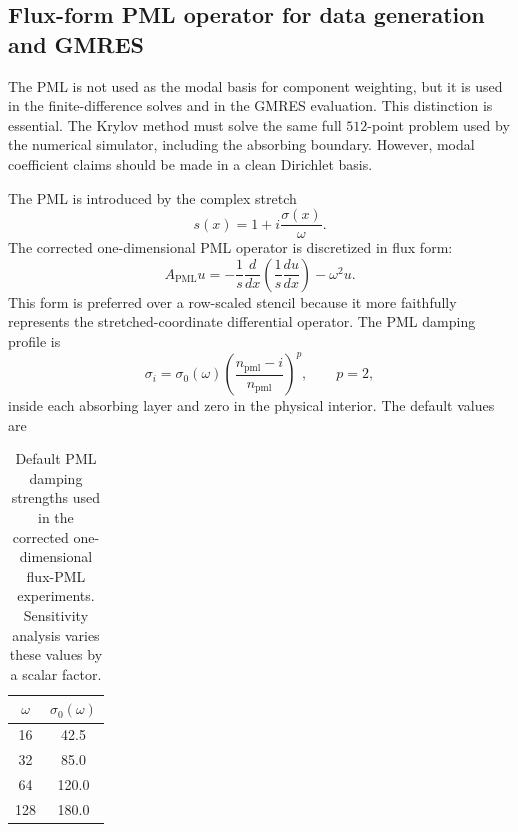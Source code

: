 \subsection{Flux-form PML operator for data generation and GMRES}
\label{subsec:methodology_1d_flux_pml}

The PML is not used as the modal basis for component weighting, but it is used
in the finite-difference solves and in the GMRES evaluation. This distinction
is essential. The Krylov method must solve the same full $512$-point problem
used by the numerical simulator, including the absorbing boundary. However,
modal coefficient claims should be made in a clean Dirichlet basis.

The PML is introduced by the complex stretch
\begin{equation}
    s(x) = 1 + i\frac{\sigma(x)}{\omega}.
    \label{eq:oned_pml_stretch}
\end{equation}
The corrected one-dimensional PML operator is discretized in flux form:
\begin{equation}
    A_{\mathrm{PML}} u
    =
    -\frac{1}{s}
    \frac{d}{dx}
    \left(
        \frac{1}{s}\frac{du}{dx}
    \right)
    - \omega^2 u.
    \label{eq:oned_flux_pml_operator}
\end{equation}
This form is preferred over a row-scaled stencil because it more faithfully
represents the stretched-coordinate differential operator. The PML damping
profile is
\begin{equation}
    \sigma_i
    =
    \sigma_0(\omega)
    \left(
        \frac{n_{\mathrm{pml}} - i}{n_{\mathrm{pml}}}
    \right)^p,
    \qquad p=2,
    \label{eq:oned_pml_profile}
\end{equation}
inside each absorbing layer and zero in the physical interior. The default
values are
\begin{table}[h]
\centering
\begin{tabular}{cc}
\toprule
$\omega$ & $\sigma_0(\omega)$ \\
\midrule
16  & 42.5 \\
32  & 85.0 \\
64  & 120.0 \\
128 & 180.0 \\
\bottomrule
\end{tabular}
\caption{Default PML damping strengths used in the corrected one-dimensional
flux-PML experiments. Sensitivity analysis varies these values by a scalar
factor.}
\label{tab:oned_sigma_values}
\end{table}

